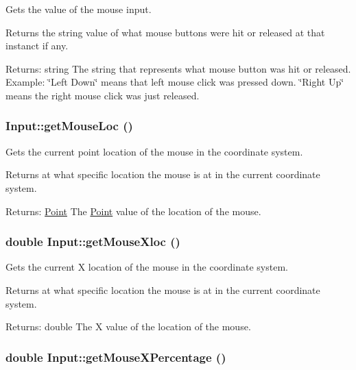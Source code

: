 Gets the value of the mouse input. 

Returns the string value of what mouse buttons were hit or released at that instanct if any. \begin{Desc}
\item[Returns:]string The string that represents what mouse button was hit or released. Example: \char`\"{}Left Down\char`\"{} means that left mouse click was pressed down. \char`\"{}Right Up\char`\"{} means the right mouse click was just released. \end{Desc}
\hypertarget{class_input_ded500159307fc2ea8c478848e88ecab}{
\subsubsection[{getMouseLoc}]{ Input::getMouseLoc ()}}
\label{class_input_ded500159307fc2ea8c478848e88ecab}


Gets the current point location of the mouse in the coordinate system. 

Returns at what specific location the mouse is at in the current coordinate system. \begin{Desc}
\item[Returns:]\hyperlink{class_point}{Point} The \hyperlink{class_point}{Point} value of the location of the mouse. \end{Desc}
\hypertarget{class_input_d9e2f63414a5cd0d7f4d79614a4764c8}{
\subsubsection[{getMouseXloc}]{\setlength{\rightskip}{0pt plus 5cm}double Input::getMouseXloc ()}}
\label{class_input_d9e2f63414a5cd0d7f4d79614a4764c8}


Gets the current X location of the mouse in the coordinate system. 

Returns at what specific location the mouse is at in the current coordinate system. \begin{Desc}
\item[Returns:]double The X value of the location of the mouse. \end{Desc}
\hypertarget{class_input_08d4ec3b79961d3c98a057bb718f31e4}{
\subsubsection[{getMouseXPercentage}]{\setlength{\rightskip}{0pt plus 5cm}double Input::getMouseXPercentage ()}}
\label{class_input_08d4ec3b79961d3c98a057bb718f31e4}


